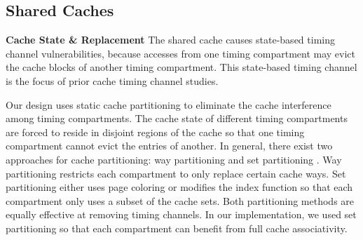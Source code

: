\subsection{Shared Caches}
\mbox{}\newline
\textbf{Cache State \& Replacement}
The shared cache causes state-based timing channel vulnerabilities, because accesses
from one timing compartment may evict the cache blocks of another timing compartment.
This state-based timing channel is the focus of prior cache timing channel 
studies.

Our design uses static cache partitioning to eliminate the cache
interference among timing compartments.
The cache state of different timing compartments are forced to reside in 
disjoint regions of the cache so that one timing compartment cannot evict the 
entries of another.
In general, there exist two approaches for cache partitioning:
way partitioning \cite{dynamic_partitioning} and
set partitioning \cite{rtas_cache_framework}. Way partitioning restricts
each compartment to only replace certain cache ways. Set partitioning
either uses page coloring or modifies the index function so that each compartment
only uses a subset of the cache sets. Both partitioning methods are equally
effective at removing timing channels. In our implementation, we used
set partitioning so that each compartment can benefit from full 
cache associativity.




